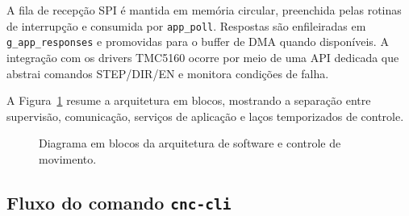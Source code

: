 A fila de recepção SPI é mantida em memória circular, preenchida pelas
rotinas de interrupção e consumida por \texttt{app\_poll}. Respostas são
enfileiradas em \texttt{g\_app\_responses} e promovidas para o buffer de DMA
quando disponíveis. A integração com os drivers TMC5160 ocorre por meio
de uma API dedicada que abstrai comandos STEP/DIR/EN e monitora
condições de falha.

A Figura~\ref{fig:arquitetura-blocos} resume a arquitetura em blocos,
mostrando a separação entre supervisão, comunicação, serviços de
aplicação e laços temporizados de controle.

\begin{figure}[H]
    \centering
    \caption{Diagrama em blocos da arquitetura de software e controle de movimento.}
    \label{fig:arquitetura-blocos}
\end{figure}

\subsection{Fluxo do comando \texttt{cnc-cli}}


